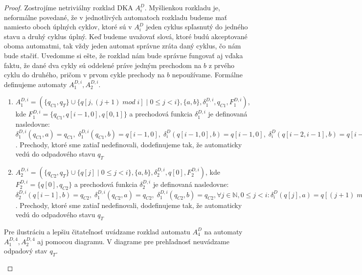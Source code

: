 \begin{proof}
Zostrojíme netriviálny rozklad DKA $ A_i^D $. Myšlienkou rozkladu je, neformálne povedané, že v jednotlivých automatoch rozkladu budeme mať namiesto oboch úplných cyklov, ktoré sú v $ A_i^D $ jeden cyklus \glqq{}spľasnutý\grqq{} do jedného stavu a druhý cyklus úplný. Keď budeme uvažovať slová, ktoré budú akceptované oboma automatmi, tak vždy jeden automat správne zráta daný cyklus, čo nám bude stačiť. Uvedomme si ešte, že rozklad nám bude správne fungovať aj vďaka faktu, že dané dva cykly sú oddelené práve jedným prechodom na $ b $ z prvého cyklu do druhého, pričom v prvom cykle prechody na $ b $ nepoužívame. Formálne definujeme automaty $ A_1^{D,i}, A_2^{D,i} $. 
\begin{enumerate}
\item $ A_1^{D,i} = (\lbrace q_{C1}, q_T \rbrace \cup \lbrace q[j,(j+1) \; mod \; i] \; | \; 0 \leq j < i \rbrace, \lbrace a,b \rbrace, \delta_1^{D,i}, q_{C1}, F_1^{D,i}) $, kde $ F_1^{D,i} = \lbrace q_{C1}, q[i-1,0],q[0,1] \rbrace$ a prechodová funkcia $ \delta_1^{D,i} $ je definovaná nasledovne: $ \delta_1^{D,i}(q_{C1},a) = q_{C1}, \; \delta_1^{D,i}(q_{C1},b) = q[i-1,0], \; \delta_i^D(q[i-1,0],b) = q[i-1,0], \; \delta_i^D(q[i-2,i-1],b) = q[i-1,0], \; \forall j \in \mathbb{N}, 0 \leq j < i : \delta_i^D(q[j,(j+1) \; mod \; i],a) = q[(j+1) \; mod \; i, (((j+1) \; mod \; i)+1)  \; mod \; i] $. Prechody, ktoré sme zatiaľ nedefinovali, dodefinujeme tak, že automaticky vedú do odpadového stavu $ q_T $ 
\item $ A_2^{D,i} = (\lbrace q_{C2}, q_T \rbrace \cup \lbrace q[j] \; | \; 0 \leq j < i \rbrace, \lbrace a,b \rbrace, \delta_2^{D,i}, q[0], F_2^{D,i}) $, kde $ F_2^{D,i} = \lbrace q[0], q_{C2} \rbrace $ a prechodová funkcia $ \delta_2^{D,i} $ je definovaná nasledovne: $ \delta_2^{D,i}(q[i-1],b) = q_{C2}, \; \delta_1^{D,i}(q_{C2},a) = q_{C2}, \; \delta_1^{D,i}(q_{C2},b) = q_{C2}, \forall j \in \mathbb{N}, 0 \leq j < i : \delta_i^D(q[j],a) = q[(j+1) \; mod \; i] $. Prechody, ktoré sme zatiaľ nedefinovali, dodefinujeme tak, že automaticky vedú do odpadového stavu $ q_T $
\end{enumerate}
Pre ilustráciu a lepšiu čitateľnosť uvádzame rozklad automatu $ A_4^D $ na automaty $ A_1^{D,4}, A_2^{D,4} $ aj pomocou diagramu. V diagrame pre prehľadnosť neuvádzame odpadový stav $ q_T $.

\begin{figure}[H]
\centering
{}
\end{figure}
\end{proof}
